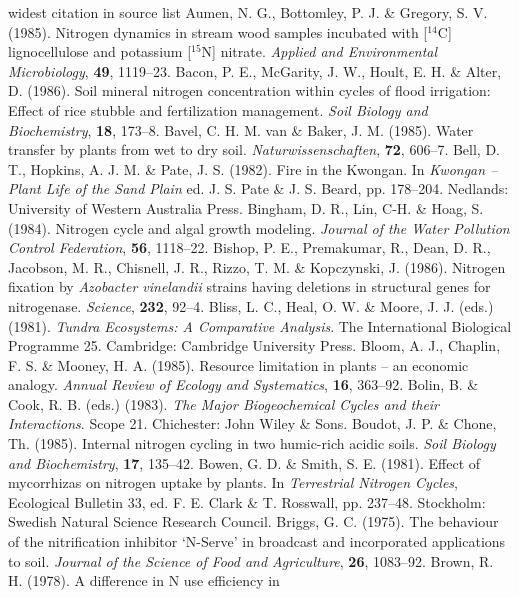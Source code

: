 \begin{thereferences}{widest citation in source list}
Aumen, N. G., Bottomley, P. J. \& Gregory, S. V.
(1985). Nitrogen dynamics in stream wood samples incubated with
[${}^{14}$C] lignocellulose and potassium [${}^{15}$N] nitrate.
{\it Applied and Environmental Microbiology}, {\bf 49}, 1119--23.
Bacon, P. E., McGarity, J. W., Hoult, E. H. \&
Alter, D. (1986). Soil mineral nitrogen concentration within cycles
of flood irrigation: Effect of rice stubble and fertilization
management. {\it Soil Biology and Biochemistry}, {\bf 18}, 173--8.
Bavel, C. H. M. van \& Baker, J. M. (1985). Water
transfer by plants from wet to dry soil. {\it Naturwissenschaften},
{\bf 72}, 606--7.
Bell, D. T., Hopkins, A. J. M. \& Pate, J. S.
(1982). Fire in the Kwongan. In {\it Kwongan -- Plant Life
of the Sand Plain \/} ed. J. S. Pate \& J. S.
Beard, pp. 178--204. Nedlands: University of Western Australia
Press.
Bingham, D. R., Lin, C-H. \& Hoag, S. (1984). Nitrogen cycle
and algal growth modeling. {\it Journal of the Water Pollution Control
Federation}, {\bf 56}, 1118--22.
Bishop, P. E., Premakumar, R., Dean, D. R., Jacobson,
M. R., Chisnell, J. R., Rizzo, T. M. \& Kopczynski, J.
(1986). Nitrogen fixation by {\it Azobacter vinelandii\/} strains
having deletions in structural genes for nitrogenase. {\it Science},
{\bf 232}, 92--4.
Bliss, L. C., Heal, O. W. \& Moore, J. J. (eds.)
(1981). {\it Tundra Ecosystems: A Comparative
Analysis}. The International Biological Programme 25. Cambridge:
Cambridge University Press.
Bloom, A. J., Chaplin, F. S. \& Mooney, H. A.
(1985). Resource limitation in plants -- an economic
analogy. {\it Annual Review of Ecology and Systematics}, {\bf 16},
363--92.
Bolin, B. \& Cook, R. B. (eds.) (1983). {\it The Major
Biogeochemical Cycles and their Interactions}. Scope 21.
Chichester: John Wiley \& Sons.
Boudot, J. P. \& Chone, Th. (1985). Internal nitrogen
cycling in two humic-rich acidic soils. {\it Soil Biology and
Biochemistry}, {\bf 17}, 135--42.
Bowen, G. D. \& Smith, S. E. (1981). Effect of
mycorrhizas on nitrogen uptake by plants. In {\it Terrestrial
Nitrogen Cycles}, Ecological Bulletin 33, ed. F. E.
Clark \& T. Rosswall, pp. 237--48. Stockholm: Swedish
Natural Science Research Council.
Briggs, G. C. (1975). The behaviour of the nitrification
inhibitor `N-Serve' in broadcast and incorporated
applications to soil. {\it Journal of the Science of Food and
Agriculture}, {\bf 26}, 1083--92.
Brown, R. H. (1978). A difference in N use efficiency in

\end{thereferences}
